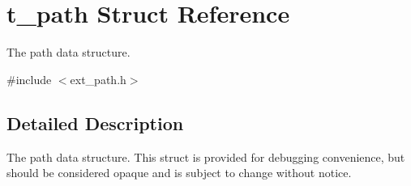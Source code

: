 \hypertarget{structt__path}{
\section{t\_\-path Struct Reference}
\label{structt__path}
}


The path data structure.  


{\ttfamily \#include $<$ext\_\-path.h$>$}

\subsection{Detailed Description}
The path data structure. This struct is provided for debugging convenience, but should be considered opaque and is subject to change without notice. 